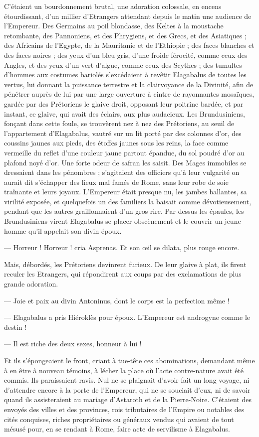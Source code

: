\documentclass[a4paper, 11pt, oneside, polutonikogreek, french]{article}
\begin{document}
C'étaient un bourdonnement brutal, une adoration colossale, en encens étourdissant, d'un millier d'Etrangers attendant depuis le matin une audience de l'Empereur. Des Germains au poil blondasse, des Keltes à la moustache retombante, des Pannoniens, et des Phrygiens, et des Grecs, et des Asiatiques ; des Africains de l'Egypte, de la Mauritanie et de l'Ethiopie ; des faces blanches et des faces noires ; des yeux d'un bleu gris, d'une froide férocité, comme ceux des Angles, et des yeux d'un vert d'algue, comme ceux des Scythes ; des tumultes d'hommes aux costumes bariolés s'excédaient à revêtir Elagabalus de toutes les vertus, lui donnant la puissance terrestre et la clairvoyance de la Divinité, afin de pénétrer auprès de lui par une large ouverture à cintre de rayonnantes mosaïques, gardée par des Prétoriens le glaive droit, opposant leur poitrine bardée, et par instant, ce glaive, qui avait des éclairs, aux plus audacieux. Les Brundusiniens, fonçant dans cette foule, se trouvèrent nez à nez des Prétoriens, au seuil de l'appartement d'Elagabalus, vautré sur un lit porté par des colonnes d'or, des coussins jaunes aux pieds, des étoffes jaunes sous les reins, la face comme vermeille du reflet d'une couleur jaune partout épandue, du sol poudré d'or au plafond noyé d'or. Une forte odeur de safran les saisit. Des Mages immobiles se dressaient dans les pénombres ; s'agitaient des officiers qu'à leur vulgarité on aurait dit s'échapper des lieux mal famés de Rome, sans leur robe de soie traînante et leurs joyaux. L'Empereur était presque nu, les jambes ballantes, sa virilité exposée, et quelquefois un des familiers la baisait comme dévotieusement, pendant que les autres graillonnaient d'un gros rire. Par-dessus les épaules, les Brundusiniens virent Elagabalus se placer obscènement et le couvrir un jeune homme qu'il appelait son divin époux.

--- Horreur ! Horreur ! cria Asprenas. Et son œil se dilata, plus rouge encore.

Mais, débordés, les Prétoriens devinrent furieux. De leur glaive à plat, ils firent reculer les Etrangers, qui répondirent aux coups par des exclamations de plus grande adoration.

--- Joie et paix au divin Antoninus, dont le corps est la perfection même !

--- Elagabalus a pris Hiéroklès pour époux. L'Empereur est androgyne comme le destin !

--- Il est riche des deux sexes, honneur à lui !

Et ils s'épongeaient le front, criant à tue-tête ces abominations, demandant même à en être à nouveau témoins, à lécher la place où l'acte contre-nature avait été commis. Ils paraissaient ravis. Nul ne se plaignait d'avoir fait un long voyage, ni d'attendre encore à la porte de l'Empereur, qui ne se souciait d'eux, ni de savoir quand ils assisteraient au mariage d'Astaroth et de la Pierre-Noire. C'étaient des envoyés des villes et des provinces, rois tributaires de l'Empire ou notables des cités conquises, riches propriétaires ou généraux vendus qui avaient de tout mésusé pour, en se rendant à Rome, faire acte de servilisme à Elagabalus.
\end{document}
